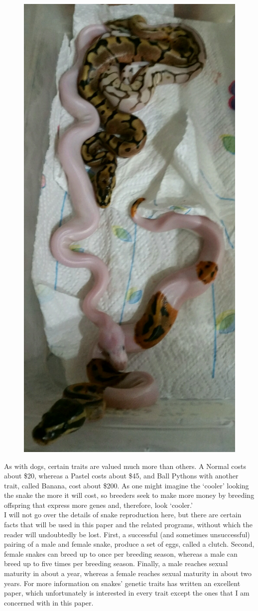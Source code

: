 \documentclass{article}
\begin{document}
	\begin{figure}[H]
	\centering
	\includegraphics[width=.5\textwidth, height=\textwidth, angle = 90]{snakes.jpg}
	\end{figure}
	
	 As with dogs, certain traits are valued much more than others. A Normal costs about \$20, whereas a Pastel costs about \$45, and Ball Pythons with another trait, called Banana, cost about \$200. As one might imagine the `cooler' looking the snake the more it will cost, so breeders seek to make more money by breeding offspring that express more genes and, therefore, look `cooler.'\\
	\indent I will not go over the details of snake reproduction here, but there are certain facts that will be used in this paper and the related programs, without which the reader will undoubtedly be lost. First, a successful (and sometimes unsuccessful) pairing of a male and female snake, produce a set of eggs, called a clutch. Second, female snakes can breed up to once per breeding season, whereas a male can breed up to five times per breeding season. Finally, a male reaches sexual maturity in about a year, whereas a female reaches sexual maturity in about two years. For more information on snakes' genetic traits \cite{morrill} has written an excellent paper, which unfortunately is interested in every trait except the ones that I am concerned with in this paper.
\end{document}
